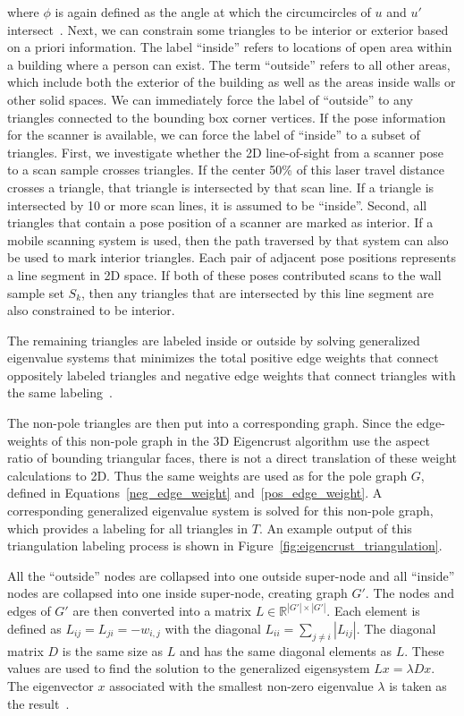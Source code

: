 \documentclass[12pt,onecolumn,oneside]{book}
\begin{document}
where $\phi$ is again defined as the angle at which the circumcircles of $u$ and $u'$ intersect~\cite{EigencrustShewchuk}.  Next, we can constrain some triangles to be interior or exterior based on a priori information.  The label ``inside'' refers to locations of open area within a building where a person can exist.  The term ``outside'' refers to all other areas, which include both the exterior of the building as well as the areas inside walls or other solid spaces.  We can immediately force the label of ``outside'' to any triangles connected to the bounding box corner vertices.  If the pose information for the scanner is available, we can force the label of ``inside'' to a subset of triangles.  First, we investigate whether the 2D line-of-sight from a scanner pose to a scan sample crosses triangles.  If the center 50\% of this laser travel distance crosses a triangle, that triangle is intersected by that scan line.  If a triangle is intersected by 10 or more scan lines, it is assumed to be ``inside''.  Second, all triangles that contain a pose position of a scanner are marked as interior.  If a mobile scanning system is used, then the path traversed by that system can also be used to mark interior triangles.  Each pair of adjacent pose positions represents a line segment in 2D space.  If both of these poses contributed scans to the wall sample set $S_k$, then any triangles that are intersected by this line segment are also constrained to be interior.

The remaining triangles are labeled inside or outside by solving generalized eigenvalue systems that minimizes the total positive edge weights that connect oppositely labeled triangles and negative edge weights that connect triangles with the same labeling~\cite{EigencrustShewchuk}.

The non-pole triangles are then put into a corresponding graph.  Since the edge-weights of this non-pole graph in the 3D Eigencrust algorithm use the aspect ratio of bounding triangular faces, there is not a direct translation of these weight calculations to 2D.  Thus the same weights are used as for the pole graph $G$, defined in Equations~\ref{neg_edge_weight} and~\ref{pos_edge_weight}.  A corresponding generalized eigenvalue system is solved for this non-pole graph, which provides a labeling for all triangles in $T$.  An example output of this triangulation labeling process is shown in Figure~\ref{fig:eigencrust_triangulation}.

All the ``outside'' nodes are collapsed into one outside super-node and all ``inside'' nodes are collapsed into one inside super-node, creating graph $G'$.  The nodes and edges of $G'$ are then converted into a matrix $L \in \mathbb{R}^{|G'| \times |G'|}$.  Each element is defined as $L_{ij} = L_{ji} = -w_{i,j}$ with the diagonal $L_{ii} = \sum_{j \neq i} |L_{ij}|$.  The diagonal matrix $D$ is the same size as $L$ and has the same diagonal elements as $L$.  These values are used to find the solution to the generalized eigensystem $L x = \lambda D x$.  The eigenvector $x$ associated with the smallest non-zero eigenvalue $\lambda$ is taken as the result~\cite{EigencrustShewchuk}.
\end{document}
